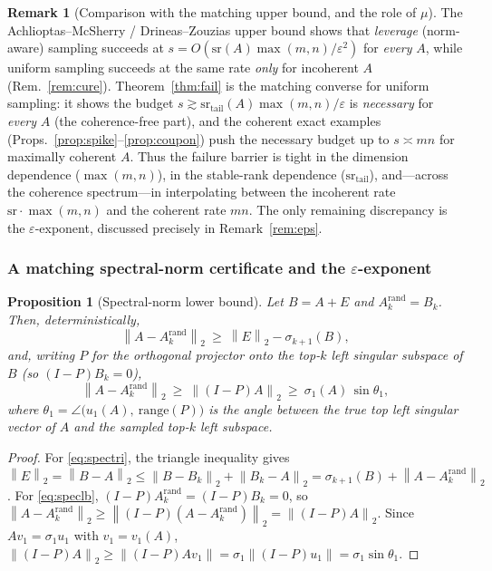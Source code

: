 \documentclass{amsart}
\newtheorem{proposition}{Proposition}
\theoremstyle{definition}
\newtheorem{remark}{Remark}
\newcommand{\Op}[1]{\left\lVert #1\right\rVert_2}
\begin{document}
\begin{remark}[Comparison with the matching upper bound, and the role of $\mu$]\label{rem:match}
The Achlioptas--McSherry / Drineas--Zouzias upper bound shows that
\emph{leverage} (norm-aware) sampling succeeds at
$s=O(\mathrm{sr}(A)\max(m,n)/\varepsilon^2)$ for \emph{every} $A$, while uniform
sampling succeeds at the same rate \emph{only} for incoherent $A$
(Rem.~\ref{rem:cure}). Theorem~\ref{thm:fail} is the matching converse for
uniform sampling: it shows the budget
$s\gtrsim\mathrm{sr}_{\mathrm{tail}}(A)\max(m,n)/\varepsilon$ is \emph{necessary}
for \emph{every} $A$ (the coherence-free part), and the coherent exact examples
(Props.~\ref{prop:spike}--\ref{prop:coupon}) push the necessary budget up to
$s\asymp mn$ for maximally coherent $A$. Thus the failure barrier is tight in the
dimension dependence ($\max(m,n)$), in the stable-rank dependence
($\mathrm{sr}_{\mathrm{tail}}$), and---across the coherence spectrum---in
interpolating between the incoherent rate $\mathrm{sr}\cdot\max(m,n)$ and the
coherent rate $mn$. The only remaining discrepancy is the $\varepsilon$-exponent,
discussed precisely in Remark~\ref{rem:eps}.
\end{remark}

\subsubsection*{A matching spectral-norm certificate and the $\varepsilon$-exponent}

\begin{proposition}[Spectral-norm lower bound]\label{prop:specfail}
Let $B=A+E$ and $A_k^{\mathrm{rand}}=B_k$. Then, deterministically,
\begin{equation}\label{eq:spectri}
\Op{A-A_k^{\mathrm{rand}}}\ \ge\ \Op E-\sigma_{k+1}(B),
\end{equation}
and, writing $P$ for the orthogonal projector onto the top-$k$ \emph{left}
singular subspace of $B$ (so $(I-P)B_k=0$),
\begin{equation}\label{eq:speclb}
\Op{A-A_k^{\mathrm{rand}}}\ \ge\ \Op{(I-P)A}\ \ge\ \sigma_1(A)\,\sin\theta_1,
\end{equation}
where $\theta_1=\angle\big(u_1(A),\ \mathrm{range}(P)\big)$ is the angle between
the true top \emph{left} singular vector of $A$ and the sampled top-$k$ left
subspace.
\end{proposition}

\begin{proof}
For \eqref{eq:spectri}, the triangle inequality gives
$\Op E=\Op{B-A}\le\Op{B-B_k}+\Op{B_k-A}=\sigma_{k+1}(B)+\Op{A-A_k^{\mathrm{rand}}}$.
For \eqref{eq:speclb}, $(I-P)A_k^{\mathrm{rand}}=(I-P)B_k=0$, so
$\Op{A-A_k^{\mathrm{rand}}}\ge\Op{(I-P)(A-A_k^{\mathrm{rand}})}=\Op{(I-P)A}$.
Since $Av_1=\sigma_1 u_1$ with $v_1=v_1(A)$,
$\Op{(I-P)A}\ge\|(I-P)Av_1\|=\sigma_1\|(I-P)u_1\|=\sigma_1\sin\theta_1$.
\end{proof}
\end{document}
